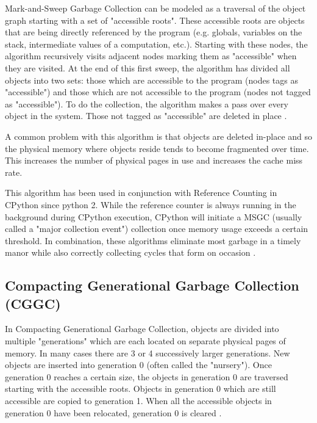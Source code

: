 \documentclass{article}
\begin{document}
Mark-and-Sweep Garbage Collection can be modeled as a traversal of the object graph starting with a set of "accessible roots".  These accessible roots are objects that are being directly referenced by the program (e.g. globals, variables on the stack, intermediate values of a computation, etc.).  Starting with these nodes, the algorithm recursively visits adjacent nodes marking them as "accessible" when they are visited.  At the end of this first sweep, the algorithm has divided all objects into two sets: those which are accessible to the program (nodes tags as "accessible") and those which are not accessible to the program (nodes not tagged as "accessible").  To do the collection, the algorithm makes a pass over every object in the system.  Those not tagged as "accessible" are deleted in place \cite{GC-continuum}. 

A common problem with this algorithm is that objects are deleted in-place and so the physical memory where objects reside tends to become fragmented over time.  This increases the number of physical pages in use and increases the cache miss rate.  

This algorithm has been used in conjunction with Reference Counting in CPython since python 2.  While the reference counter is always running in the background during CPython execution, CPython will initiate a MSGC (usually called a "major collection event") collection once memory usage exceeds a certain threshold.  In combination, these algorithms eliminate most garbage in a timely manor while also correctly collecting cycles that form on occasion \cite{cpython3-doc}.  

\subsection{Compacting Generational Garbage Collection (CGGC)}\label{sec:CGGC}

In Compacting Generational Garbage Collection, objects are divided into multiple "generations" which are each located on separate physical pages of memory.  In many cases there are 3 or 4 successively larger generations.  New objects are inserted into generation 0 (often called the "nursery").  Once generation 0 reaches a certain size, the objects in generation 0 are traversed starting with the accessible roots.  Objects in generation 0 which are still accessible are copied to generation 1.  When all the accessible objects in generation 0 have been relocated, generation 0 is cleared \cite{GC-continuum}.  
\end{document}
